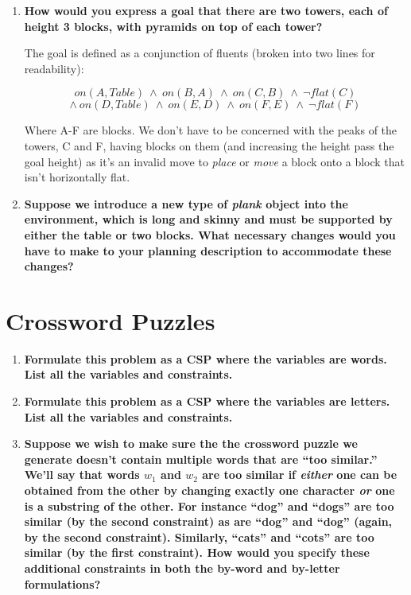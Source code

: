 \documentclass[11pt, letterpaper]{hw}
\begin{document}
\begin{enumerate}
\item \textbf{How would you express a goal that there are two towers, each of height 3 blocks, with pyramids on top of each tower?}

The goal is defined as a conjunction of fluents (broken into two lines for readability):

$$on(A, Table) \ \wedge \ on(B, A) \ \wedge \ on(C, B) \ \wedge \ \neg flat(C)$$
$$\wedge \ on(D, Table) \ \wedge \ on(E, D) \ \wedge \ on(F, E) \ \wedge \ \neg flat(F)$$

Where A-F are blocks. We don't have to be concerned with the peaks of the towers, C and F, having blocks on them (and increasing the height pass the goal height) as it's an invalid move to \textit{place} or \textit{move} a block onto a block that isn't horizontally flat.

\item \textbf{Suppose we introduce a new type of \emph{plank} object into the environment, which is long and skinny and must be supported by either the table or two blocks. What necessary changes would you have to make to your planning description to accommodate these changes?}
\end{enumerate}

\section{Crossword Puzzles}
\begin{enumerate}
\item \textbf{Formulate this problem as a CSP where the variables are words. List all the variables and constraints.}
\item \textbf{Formulate this problem as a CSP where the variables are letters. List all the variables and constraints.}
\item \textbf{Suppose we wish to make sure the the crossword puzzle we generate
doesn't contain multiple words that are ``too similar.''  We'll say
that words $w_1$ and $w_2$ are too similar if \emph{either} one can be
obtained from the other by changing exactly one character \emph{or}
one is a substring of the other.  For instance ``dog'' and ``dogs''
are too similar (by the second constraint) as are ``dog'' and ``dog''
(again, by the second constraint).  Similarly, ``cats'' and ``cots''
are too similar (by the first constraint).  How would you specify
these additional constraints in both the by-word and by-letter
formulations?}
\end{enumerate}
\end{document}
